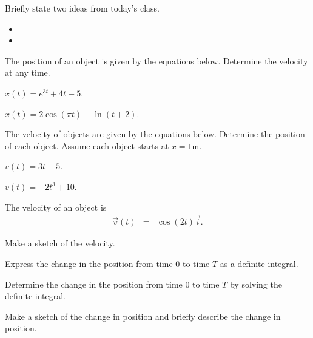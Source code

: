 \postClass

\begin{problem}
\item Briefly state two ideas from today's class.
  \begin{itemize}
  \item
  \item
  \end{itemize}
\item The position of an object is given by the equations
  below. Determine the velocity at any time.
  \begin{subproblem}
  \item $x(t) = e^{3t} + 4t  - 5$.
    \vfill
  \item $x(t) = 2\cos(\pi t) + \ln(t+2)$.
    \vfill
  \end{subproblem}
\item The velocity of objects are given by the equations
  below. Determine the position of each object. Assume each object
  starts at $x=1$m.
  \begin{subproblem}
  \item $v(t) = 3t - 5$.
    \vfill
  \item $v(t) = -2 t^3 + 10$.
    \vfill
  \end{subproblem}
\clearpage
\item The velocity of an object is
  \begin{eqnarray*}
    \vec{v}(t) & = & \cos(2t) \vec{i}.
  \end{eqnarray*}
  \begin{subproblem}
  \item Make a sketch of the velocity.
    \vfill
  \item Express the change in the position from time 0 to time $T$ as
    a definite integral.
    \vfill
  \item Determine the change in the position from time 0 to time $T$
    by solving the definite integral.
    \vfill
  \item Make a sketch of the change in position and briefly describe
    the change in position.
    \vfill
  \end{subproblem}
  \clearpage


\end{problem}
